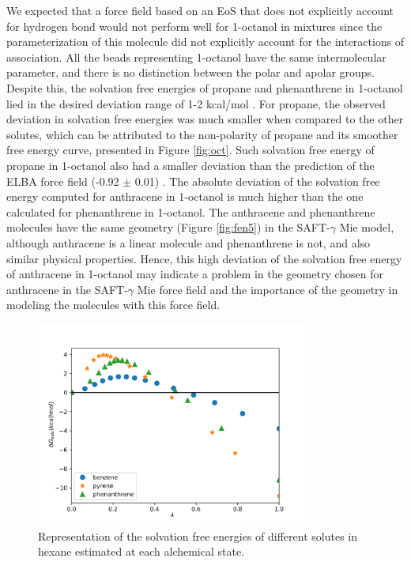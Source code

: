 We expected that a force field based on an EoS that does not explicitly account for hydrogen bond would not perform well for 1-octanol in mixtures since the parameterization of this molecule did not explicitly account for the interactions of association. All the beads representing 1-octanol have the same intermolecular parameter, and there is no distinction between the polar and apolar groups. Despite this, the solvation free energies of propane and phenanthrene in 1-octanol lied in the desired deviation range of 1-2 kcal/mol \cite{doimobley}. For propane, the observed deviation in solvation free energies was much smaller when compared to the other solutes, which can be attributed to the non-polarity of propane and its smoother free energy curve, presented in Figure \ref{fig:oct}. Such solvation free energy of propane in 1-octanol also had a smaller deviation than the prediction of the ELBA force field (-0.92 $\pm$ 0.01) \cite{doi:10.1021/acs.jctc.5b00963}. The absolute deviation of the solvation free energy computed for anthracene in 1-octanol is much higher than the one calculated for phenanthrene in 1-octanol. The anthracene and phenanthrene molecules have the same geometry (Figure \ref{fig:fen5}) in the SAFT-$\gamma$ Mie model, although anthracene is a linear molecule and phenanthrene is not, and also similar physical properties. Hence, this high deviation of the solvation free energy of anthracene in 1-octanol may indicate a problem in the geometry chosen for anthracene in the SAFT-$\gamma$ Mie force field and the importance of the geometry in modeling the molecules with this force field.      
\FloatBarrier
\begin{figure}[H]
	\centering
	\includegraphics[width=0.8\textwidth]{Figures/hex}
	\caption{Representation of the solvation free energies of different solutes in hexane estimated at each alchemical state.}
	\label{fig:hex}
\end{figure}

